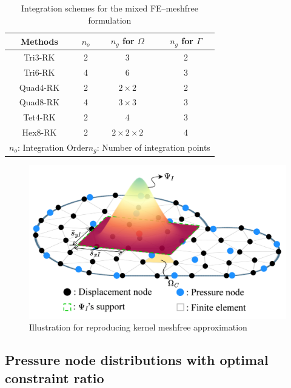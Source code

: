 \begin{table}[H]
\centering
\caption{Integration schemes for the mixed FE--meshfree formulation}
\label{tab_gauss}
\begin{tabular}{cccc}
\toprule
Methods & $n_o$ &$n_g$ for $\Omega$ & $n_g$ for $\Gamma$ \\
\midrule
Tri3-RK & 2 & 3 & 2 \\
Tri6-RK & 4 & 6 & 3 \\
Quad4-RK & 2 & $2\times2$ & 2 \\
Quad8-RK & 4 & $3\times3$ & 3 \\
Tet4-RK & 2 & 4 & 3 \\
Hex8-RK & 2 & $2\times2\times2$ & 4 \\
\multicolumn{4}{l}{\footnotesize{$n_o$: Integration Order\quad $n_g$: Number of integration points}} \\
\bottomrule
\end{tabular}
\end{table}



\begin{figure}[H]
\centering
\includegraphics[width=\textwidth]{png/mix.png}
\caption{Illustration for reproducing kernel meshfree approximation}\label{fg:rk_approximation}
\end{figure}

\subsection{Pressure node distributions with optimal constraint ratio}\label{subsec:optimal_constraint_ratio}

